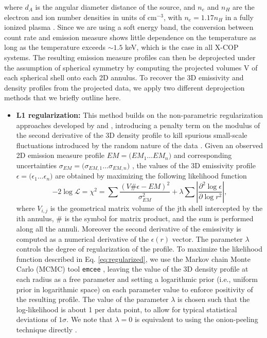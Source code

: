 \documentclass[traditabstract   ]{aa} %
\begin{document}
\noindent where $d_A$ is the angular diameter distance of the source, and $n_e$ and $n_H$ are the electron and ion number densities in units of cm$^{-3}$, with $n_e=1.17n_H$ in a fully ionized plasma \citep{ag89}. Since we are using a soft energy band, the conversion between count rate and emission measure shows little dependence on the temperature as long as the temperature exceeds $\sim1.5$ keV, which is the case in all X-COP systems. The resulting emission measure profiles can then be deprojected under the assumption of spherical symmetry by computing the projected volumes V of each spherical shell onto each 2D annulus. To recover the 3D emissivity and density profiles from the projected data, we apply two different deprojection methods that we briefly outline here.

\begin{itemize}
\item \textbf{L1 regularization:} This method builds on the non-parametric regularization approaches developed  by \citet{croston+06} and \citet{ameglio+07}, introducing a penalty term on the modulus of the second derivative of the 3D density profile to kill spurious small-scale fluctuations introduced by the random nature of the data \citep{diaz17}. Given an observed 2D emission measure profile  ${EM =(EM_1 \dots EM_n})$  and corresponding uncertainties { ${\sigma_{EM} =(\sigma_{EM,1} \dots \sigma_{EM,n}})$ }, the values of the 3D emissivity profile  { ${\epsilon =(\epsilon_1 \dots \epsilon_n})$ } are obtained by maximizing the following likelihood function
\begin{equation}
-2 \log \mathcal{L} = \chi^2 = \sum \frac{( V \# \epsilon - EM )^2}{\sigma_{EM}^2} + \lambda \sum \left| \frac{\partial^2 \log \epsilon }{\partial \log r^2} \right|
\label{eq:regularized}
,\end{equation}
{ where $V_{i,j}$ is the geometrical matrix volume of the j$\text{th}$ shell intercepted by the i$\text{th}$ annulus, $\#$ is the symbol for matrix product, and the sum is performed along all the annuli. Moreover the second derivative of the emissivity is computed as a numerical derivative of the $\epsilon(r)$ vector. }
The parameter $\lambda$ controls the degree of regularization of the profile. To maximize the likelihood function described in Eq. \ref{eq:regularized}, we use the Markov chain Monte Carlo (MCMC) tool \texttt{emcee} \citep{foreman-mackey13}, leaving the value of the 3D density profile at each radius as a free parameter and setting a logarithmic prior (i.e., uniform prior in logarithmic space) on each parameter value to enforce positivity of the resulting profile. The value of the parameter $\lambda$ is chosen such that the log-likelihood is about 1 per data point, to allow for typical statistical deviations of $1\sigma$. We note that $\lambda = 0$ is equivalent to using the onion-peeling technique directly \citep[see][]{kriss+83, ettori+02, ettori+10}.

\end{itemize}
\end{document}
